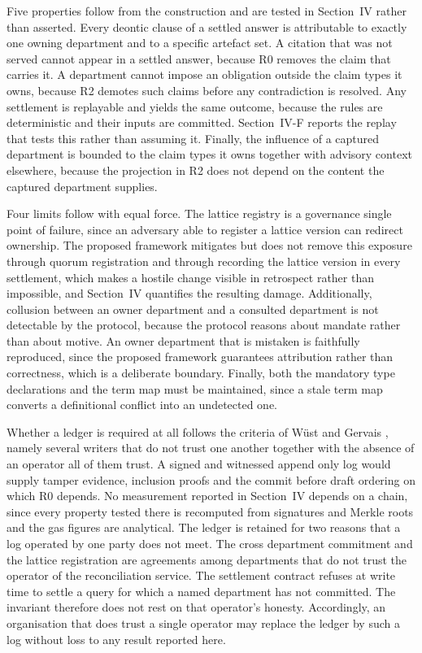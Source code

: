\documentclass[journal]{IEEEtran}
\begin{document}
Five properties follow from the construction and are tested in Section~IV rather than asserted. Every deontic clause of a settled answer is attributable to exactly one owning department and to a specific artefact set. A citation that was not served cannot appear in a settled answer, because R0 removes the claim that carries it. A department cannot impose an obligation outside the claim types it owns, because R2 demotes such claims before any contradiction is resolved. Any settlement is replayable and yields the same outcome, because the rules are deterministic and their inputs are committed. Section~IV-F reports the replay that tests this rather than assuming it. Finally, the influence of a captured department is bounded to the claim types it owns together with advisory context elsewhere, because the projection in R2 does not depend on the content the captured department supplies.

Four limits follow with equal force. The lattice registry is a governance single point of failure, since an adversary able to register a lattice version can redirect ownership. The proposed framework mitigates but does not remove this exposure through quorum registration and through recording the lattice version in every settlement, which makes a hostile change visible in retrospect rather than impossible, and Section~IV quantifies the resulting damage. Additionally, collusion between an owner department and a consulted department is not detectable by the protocol, because the protocol reasons about mandate rather than about motive. An owner department that is mistaken is faithfully reproduced, since the proposed framework guarantees attribution rather than correctness, which is a deliberate boundary. Finally, both the mandatory type declarations and the term map must be maintained, since a stale term map converts a definitional conflict into an undetected one.

Whether a ledger is required at all follows the criteria of W\"{u}st and Gervais \cite{wust2018blockchain}, namely several writers that do not trust one another together with the absence of an operator all of them trust. A signed and witnessed append only log would supply tamper evidence, inclusion proofs and the commit before draft ordering on which R0 depends. No measurement reported in Section~IV depends on a chain, since every property tested there is recomputed from signatures and Merkle roots and the gas figures are analytical. The ledger is retained for two reasons that a log operated by one party does not meet. The cross department commitment and the lattice registration are agreements among departments that do not trust the operator of the reconciliation service. The settlement contract refuses at write time to settle a query for which a named department has not committed. The invariant therefore does not rest on that operator's honesty. Accordingly, an organisation that does trust a single operator may replace the ledger by such a log without loss to any result reported here.
\end{document}
